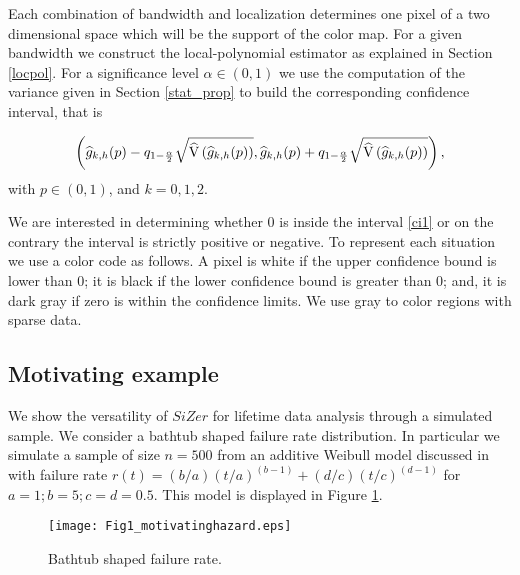 \documentclass[preprint,12pt]{elsarticle}
\begin{document}
Each combination of bandwidth and localization determines one pixel of a two dimensional space which will be the support of the color map. For a given bandwidth we construct the local-polynomial estimator as explained in Section \ref{locpol}. For a significance level $\alpha \in (0,1)$ we use the computation of the variance given in Section \ref{stat_prop} to build the corresponding confidence interval, that is
 
\begin{equation}\label{ci1}
\left(\widehat{g}_{k,h}(p)-q_{1-\frac{\alpha}{2}}\sqrt{{\rm \widehat{V}}\left(\widehat{g}_{k,h}(p)\right)},\widehat{g}_{k,h}(p)+q_{1-\frac{\alpha}{2}}\sqrt{{\rm \widehat{V}}\left(\widehat{g}_{k,h}(p)\right)}\right),
\end{equation}
 with $p \in (0,1)$, and $k=0,1,2$.

We are interested in determining whether 0 is inside the interval \eqref{ci1} or on the contrary the interval is strictly positive or negative. To represent each situation we use a color code as follows. A pixel is white if the upper confidence bound is lower than 0; it is black if the lower confidence  bound is greater than 0; and, it is  dark gray if zero is within the confidence limits. We use gray to color regions with sparse data.

\subsection{Motivating example}
We show the versatility of $SiZer$ for lifetime data analysis through a simulated sample. We consider a bathtub shaped failure rate distribution. In particular we simulate a sample of size $n=500$ from an additive Weibull model discussed in \cite{XieLai96} with failure rate $r(t)=(b/a)(t/a)^{(b-1)}+(d/c)(t/c)^{(d-1)}$ for $a=1;b=5;c=d=0.5$. This model is displayed in Figure \ref{Fig:simulatedhazard}.

\begin{figure}[htb]
\begin{center}
\texttt{[image: Fig1\_motivatinghazard.eps]}
\caption{Bathtub shaped failure rate.}\label{Fig:simulatedhazard}
\end{center}
\end{figure}
\end{document}
